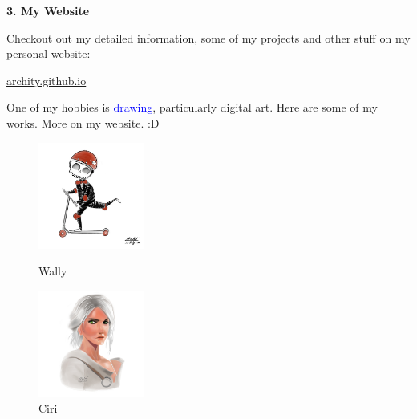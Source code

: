 \documentclass[mathserif,9pt]{beamer}
\begin{document}
\begin{frame}
\small{

\textcolor{b_bruz}{\Large{\bf 3. My Website}}
\medskip

Checkout out my detailed information, some of my projects and other stuff on my personal website:
\smallskip

\href{https://archity.github.io}{archity.github.io} 
\bigskip

\textcolor{b_bruz}{}
\medskip

One of my hobbies is \textcolor{blue}{drawing}, particularly digital art. Here are some of my works. More on my website. :D

\begin{figure}[!tbp]
  \centering
  \begin{minipage}[b]{0.4\textwidth}
    \centering
    \includegraphics[width=3.5cm]{images/wally_procreate_compresed.jpg}
    \caption{Wally}
  \end{minipage}
  \hfill
  \begin{minipage}[b]{0.4\textwidth}
    \centering
    \includegraphics[width=3.5cm]{images/ciri_procreate_compressed.jpg}
    \caption{Ciri}
  \end{minipage}
\end{figure}



}
\end{frame}


\end{document}
